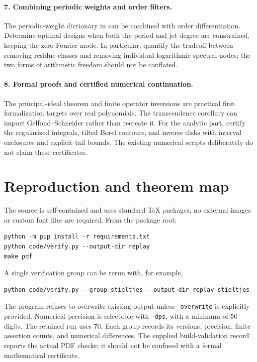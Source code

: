 \documentclass[11pt,a4paper]{article}
\numberwithin{equation}{section}
\theoremstyle{definition}\newtheorem{definition}[theorem]{Definition}
\theoremstyle{remark}\newtheorem{remark}[theorem]{Remark}
\begin{document}
\paragraph{7. Combining periodic weights and order filters.}
The periodic-weight dictionary in \cite{RepoResonant} can be combined
with order differentiation. Determine optimal designs when both the
period and jet degree are constrained, keeping the zero Fourier mode.
In particular, quantify the tradeoff between removing residue classes
and removing individual logarithmic spectral nodes; the two forms of
arithmetic freedom should not be conflated.

\paragraph{8. Formal proofs and certified numerical continuation.}
The principal-ideal theorem and finite operator inversions are practical
first formalization targets over real polynomials. The transcendence
corollary can import Gelfond--Schneider rather than recreate it. For the
analytic part, certify the regularized integrals, tilted Borel contours,
and inverse disks with interval enclosures and explicit tail bounds.
The existing numerical scripts deliberately do not claim these certificates.

\appendix
\section{Reproduction and theorem map}
\label{ojf:app:reproduce}

The source is self-contained and uses standard TeX packages; no external
images or custom font files are required. From the package root:
\begin{verbatim}
python -m pip install -r requirements.txt
python code/verify.py --output-dir replay
make pdf
\end{verbatim}
A single verification group can be rerun with, for example,
\begin{verbatim}
python code/verify.py --group stieltjes --output-dir replay-stieltjes
\end{verbatim}
The program refuses to overwrite existing output unless
\texttt{--overwrite} is explicitly provided. Numerical precision is
selectable with \texttt{--dps}, with a minimum of 50 digits. The retained
run uses 70. Each group records its versions, precision, finite assertion
counts, and numerical differences. The supplied build-validation record
reports the actual PDF checks; it should not be confused with a formal
mathematical certificate.
\end{document}
